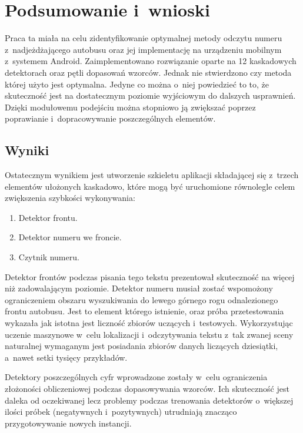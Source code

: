 \chapter{Podsumowanie i~wnioski}

Praca ta miała na celu zidentyfikowanie optymalnej metody
odczytu numeru z~nadjeżdżającego autobusu oraz jej implementację
na urządzeniu mobilnym z~systemem Android. Zaimplementowano
rozwiązanie oparte na 12 kaskadowych detektorach oraz pętli 
dopasowań wzorców. Jednak nie stwierdzono czy metoda której użyto
jest optymalna. Jedyne co można o~niej powiedzieć to to, że
skuteczność jest na dostatecznym poziomie wyjściowym do dalszych 
usprawnień. Dzięki modułowemu podejściu można stopniowo ją
zwiększać poprzez poprawianie i~dopracowywanie poszczególnych
elementów. 

\section{Wyniki}

Ostatecznym wynikiem jest utworzenie szkieletu aplikacji
składającej się z~trzech elementów ułożonych kaskadowo, które
mogą być uruchomione równolegle celem zwiększenia szybkości wykonywania:

\begin{enumerate}
    \item Detektor frontu.
    \item Detektor numeru we froncie.
    \item Czytnik numeru.
\end{enumerate}

Detektor frontów podczas pisania tego tekstu prezentował skuteczność
na więcej niż zadowalającym poziomie.
Detektor numeru musiał zostać wspomożony ograniczeniem obszaru wyszukiwania
do lewego górnego rogu odnalezionego frontu autobusu.
Jest to element którego istnienie, oraz próba przetestowania
wykazała jak istotna jest liczność zbiorów uczących i~testowych.
Wykorzystując uczenie maszynowe w~celu lokalizacji i~odczytywania
tekstu z~tak zwanej sceny naturalnej wymaganym jest posiadania
zbiorów danych liczących dziesiątki, a~nawet setki tysięcy 
przykładów.

Detektory poszczególnych cyfr wprowadzone zostały w~celu ograniczenia
złożoności obliczeniowej podczas dopasowywania wzorców. Ich skuteczność
jest daleka od oczekiwanej lecz problemy podczas trenowania detektorów
o~większej ilości próbek (negatywnych i~pozytywnych)
utrudniają znacząco przygotowywanie nowych instancji.

